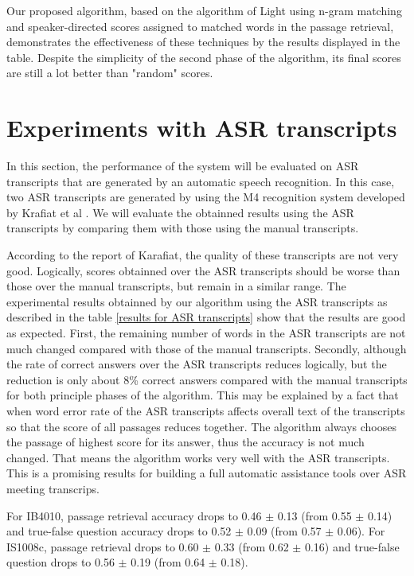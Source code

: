 Our proposed algorithm, based on the algorithm of Light using n-gram matching and speaker-directed scores assigned to matched words in the passage retrieval, demonstrates the effectiveness of these techniques by the results displayed in the table. Despite the simplicity of the second phase of the algorithm, its final scores are still a lot better than "random" scores.

\section{Experiments with ASR transcripts}

In this section, the performance of the system will be evaluated on ASR transcripts that are generated by an automatic speech recognition. In this case, two ASR transcripts are generated by using the M4 recognition system developed by Krafiat et al \cite{ASR_transcrips}. We will evaluate the obtainned results using the ASR transcripts by comparing them with those using the manual transcripts.

According to the report of Karafiat, the quality  of these transcripts are not very good. Logically, scores obtainned over the ASR transcripts should be worse than those over the manual transcripts, but remain in a similar range. The experimental results obtainned by our algorithm using the ASR transcripts as described in the table \ref{results for ASR transcripts} show that the results are good as expected. First, the remaining number of words in the ASR transcripts are not much changed compared with those of the manual transcripts. Secondly, although the rate of correct answers over the ASR transcripts reduces logically, but the reduction is only about 8\% correct answers compared with the manual transcripts for both principle phases of the algorithm. This may be explained by a fact that when word error rate of the ASR transcripts affects overall text of the transcripts so that the score of all passages reduces together. The algorithm always chooses the passage of highest score for its answer, thus the accuracy is not much changed. That means the algorithm works very well with the ASR transcripts. This is a promising results for building a full automatic assistance tools over ASR meeting transcrips.

For IB4010, passage retrieval accuracy drops to 0.46 \ensuremath{\pm} 0.13 (from 0.55 \ensuremath{\pm} 0.14) and true-false question accuracy drops to 0.52 \ensuremath{\pm} 0.09 (from 0.57 \ensuremath{\pm} 0.06). For IS1008c, passage retrieval drops to 0.60 \ensuremath{\pm} 0.33 (from 0.62 \ensuremath{\pm} 0.16) and true-false question drops to 0.56 \ensuremath{\pm} 0.19 (from 0.64 \ensuremath{\pm} 0.18).

